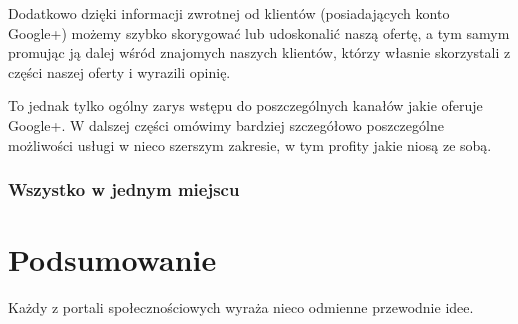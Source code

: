 \noindent Dodatkowo dzięki informacji zwrotnej od klientów (posiadających konto Google+) możemy szybko skorygować lub udoskonalić naszą ofertę, a tym samym promując ją dalej wśród znajomych naszych klientów, którzy własnie skorzystali z części naszej oferty i wyrazili opinię. 

To jednak tylko ogólny zarys wstępu do poszczególnych kanałów jakie oferuje Google+. W dalszej części omówimy bardziej szczegółowo poszczególne możliwości usługi w nieco szerszym zakresie, w tym profity jakie niosą ze sobą.


\subsubsection{Wszystko w jednym miejscu}


\clearpage
\section{Podsumowanie}

Każdy z portali społecznościowych wyraża nieco odmienne przewodnie idee. 
